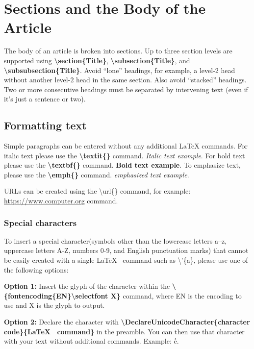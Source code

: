 \documentclass{csmagazine}
\begin{document}
\section{Sections and the Body of the Article}

The body of an article is broken into sections. Up to three section levels are supported using \textbf{\textbackslash{}section\{Title\}}, \textbf{\textbackslash{}subsection\{Title\}}, and \textbf{\textbackslash{}subsubsection\{Title\}}. Avoid ``lone'' headings, for example, a level-2 head without another level-2 head in the same section. Also avoid ``stacked'' headings. Two or more consecutive headings must be separated by intervening text (even if it's just a sentence or two).

\subsection{Formatting text}

Simple paragraphs can be entered without any additional LaTeX commands. For italic text please use the \textbf{\textbackslash{}textit\{\}} command. \textit{Italic text example}. For bold text please use the \textbf{\textbackslash{}textbf\{\}} command. \textbf{Bold text example}. To emphasize text, please use the \textbf{\textbackslash{}emph\{\}} command. \emph{emphasized text example}.

URLs can be created using the \textbackslash{}url\{\} command, for example: \url{https://www.computer.org} command.

\subsubsection{Special characters}

To insert a special character(symbols other than the lowercase letters a–z, uppercase letters A-Z, numbers 0-9, and English punctuation marks) that cannot be easily created with a single \LaTeX~ command such as \textbackslash{}'\{a\}, please use one of the following options:

\textbf{Option 1:} Insert the glyph of the character within the \textbf{\textbackslash{}\{fontencoding\{EN\}\textbackslash{}selectfont X\}} command, where EN is the encoding to use and X is the glyph to output.


\textbf{Option 2:} Declare the character with \textbf{\textbackslash{}DeclareUnicodeCharacter\{character code\}\{\LaTeX~ command\}} in the preamble. You can then use that character with your text without additional commands. Example: ế.
\end{document}
